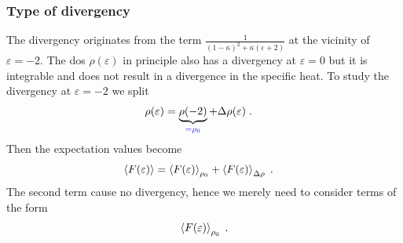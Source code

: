 \subsubsection{Type of divergency}
The divergency originates from the term $\frac{1}{(1-\kappa)^{2}+\kappa(\varepsilon+2)}$ at the vicinity of  $\varepsilon=-2$.
The dos $\rho(\varepsilon)$ in principle also has a divergency at $\varepsilon=0$ but it is integrable and does not result in a divergence
in the specific heat.
To study the divergency at $\varepsilon=-2$ we split 
%
\begin{align*}
\rho(\varepsilon) &= \underbrace{
\rho(-2)
}_{\color{blue} = \rho_{0}}  + \Delta \rho(\varepsilon)\;.
\end{align*}
%
Then the expectation values become
%
\begin{align*}
\left\langle F(\varepsilon)\right\rangle &= \left\langle F(\varepsilon)\right\rangle_{\rho_{0}} + 
\left\langle F(\varepsilon)\right\rangle_{\Delta\rho}\;.
\end{align*}
%
The second term cause no divergency, hence  we merely need to consider terms of the form
%
\begin{align}\label{eq:}
\left\langle F(\varepsilon)\right\rangle_{\rho_{0}}\;.
\end{align}
%
